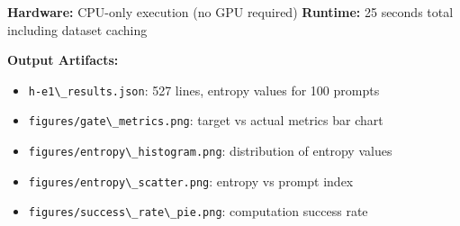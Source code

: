 \textbf{Hardware:} CPU-only execution (no GPU required)
\textbf{Runtime:} 25 seconds total including dataset caching

\textbf{Output Artifacts:}
\begin{itemize}
\item \texttt{h-e1\textbackslash \_results.json}: 527 lines, entropy values for 100 prompts
\item \texttt{figures/gate\textbackslash \_metrics.png}: target vs actual metrics bar chart
\item \texttt{figures/entropy\textbackslash \_histogram.png}: distribution of entropy values
\item \texttt{figures/entropy\textbackslash \_scatter.png}: entropy vs prompt index
\item \texttt{figures/success\textbackslash \_rate\textbackslash \_pie.png}: computation success rate
\end{itemize}


